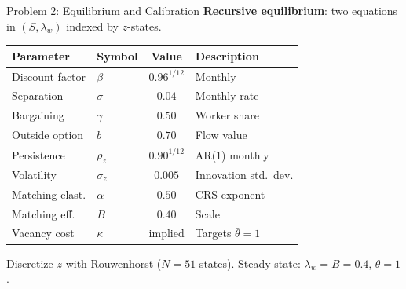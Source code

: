 \documentclass[aspectratio=169,11pt]{beamer}
\begin{document}
\begin{frame}{Problem 2: Equilibrium and Calibration}
    \textbf{Recursive equilibrium}: two equations in $(S, \lambda_w)$ indexed by $z$-states.
    \vspace{0.3em}

    \begin{center}
    \small
    \begin{tabular}{llcl}
        \toprule
        \textbf{Parameter} & \textbf{Symbol} & \textbf{Value} & \textbf{Description} \\
        \midrule
        Discount factor & $\beta$ & $0.96^{1/12}$ & Monthly \\
        Separation & $\sigma$ & $0.04$ & Monthly rate \\
        Bargaining & $\gamma$ & $0.50$ & Worker share \\
        Outside option & $b$ & $0.70$ & Flow value \\
        Persistence & $\rho_z$ & $0.90^{1/12}$ & AR(1) monthly \\
        Volatility & $\sigma_z$ & $0.005$ & Innovation std.\ dev. \\
        Matching elast. & $\alpha$ & $0.50$ & CRS exponent \\
        Matching eff. & $B$ & $0.40$ & Scale \\
        Vacancy cost & $\kappa$ & implied & Targets $\bar\theta=1$ \\
        \bottomrule
    \end{tabular}
    \end{center}
    \vspace{0.3em}
    \small
    Discretize $z$ with Rouwenhorst ($N=51$ states). Steady state: $\bar\lambda_w = B = 0.4$, $\bar\theta = 1$.
\end{frame}
\end{document}
